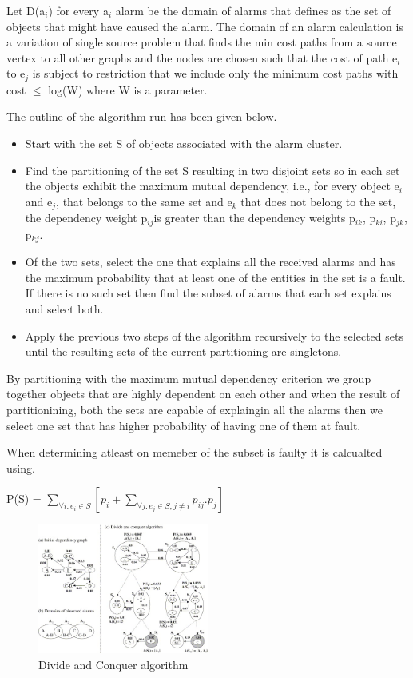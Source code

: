\documentclass[10pt]{sigplan-proc-varsize}
\begin{document}
Let D(a$_i$) for every a$_i$ alarm be the domain of alarms that defines as the set of objects that might have caused the alarm.  The domain of an alarm calculation is a variation of single source problem that finds the min cost paths from a source vertex to all other graphs and the nodes are chosen such that the cost of path e$_i$ to e$_j$ is subject to restriction that we include only the minimum cost paths with cost $\leq$ log(W) where W is a parameter.

The outline of the algorithm run has been given below.

\begin{itemize}
  \item Start with the set S of objects associated with the alarm cluster.
  \item Find the partitioning of the set S resulting in two disjoint sets so in each set the objects exhibit the maximum mutual dependency, i.e., for every object e$_i$ and e$_j$, that belongs to the same set and e$_k$ that does not belong to the set, the dependency weight p$_{ij}$is greater than the dependency weights p$_{ik}$, p$_{ki}$, p$_{jk}$, p$_{kj}$.
  \item Of the two sets, select the one that explains all the received alarms and has the maximum probability that at least one of the entities in the set is a fault. If there is no such set then find the subset of alarms that each set explains and select both.
  \item Apply the previous two steps of the algorithm recursively to the selected sets until the resulting sets of the current partitioning are singletons.
\end{itemize}

By partitioning with the maximum mutual dependency criterion we group together objects that are highly dependent on each other and when the result of partitionining, both the sets are capable of explaingin all the alarms then we select one set that has higher probability of having one of them at fault. 

When determining atleast on memeber of the subset is faulty it is calcualted using. 

P(S) = ${\underset{\forall i:e_i \in S}{\sum}}[p_i + \underset{\forall j:e_j \in S , j \neq i}{\sum} p_{ij}.p_j]$


\begin{figure}[h!]
  \caption{Divide and Conquer algorithm \cite{Katzela:95}}
  \centering
    \includegraphics[width=0.5\textwidth]{Fig5}
\end{figure}
\end{document}
